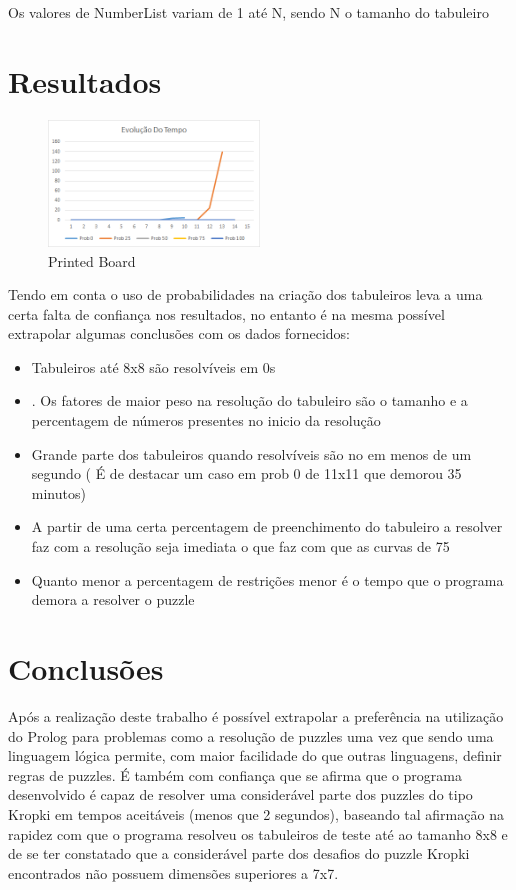 \documentclass[runningheads,a4paper]{llncs}
\begin{document}
Os valores de NumberList variam de 1 até N, sendo N o tamanho do tabuleiro
\pagebreak
\section{Resultados}
\begin{figure}[!ht]
\centering
\includegraphics[width=0.5\textwidth]{time}
\caption{Printed Board}
\end{figure}
Tendo em conta o uso de probabilidades na criação dos tabuleiros leva a uma certa falta de confiança nos resultados, no entanto é na mesma possível extrapolar algumas conclusões com os dados fornecidos:
\begin{itemize}
\item Tabuleiros até 8x8 são resolvíveis em 0s
\item. Os fatores de maior peso na resolução do tabuleiro são o tamanho e a percentagem de números presentes no inicio da resolução
\item Grande parte dos tabuleiros quando resolvíveis são no em menos de um segundo ( É de destacar um caso em prob 0 de 11x11 que demorou 35 minutos)
\item A partir de uma certa percentagem de preenchimento do tabuleiro a resolver faz com a resolução seja imediata o que faz com que as curvas de 75%
\item Quanto menor a percentagem de restrições menor é o tempo que o programa demora a resolver o puzzle
\end{itemize}
\section{Conclusões}

Após a realização deste trabalho é possível extrapolar a preferência na utilização do Prolog para problemas como a resolução de puzzles uma vez que sendo uma linguagem lógica permite, com maior facilidade do que outras linguagens, definir regras de puzzles. É também com confiança que se afirma que o programa desenvolvido é capaz de resolver uma considerável parte dos puzzles do tipo Kropki em tempos aceitáveis (menos que 2 segundos), baseando tal afirmação na rapidez com que o programa resolveu os tabuleiros de teste até ao tamanho 8x8 e de se ter constatado que a considerável parte dos desafios do puzzle Kropki encontrados não possuem dimensões superiores a 7x7.
\end{document}
